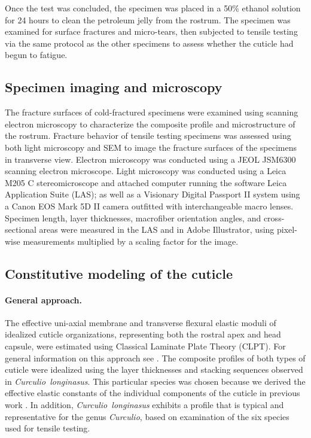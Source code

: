 \documentclass[twocolumn, linenumbers, superscriptaddress, nofootinbib]{revtex4-1}
\begin{document}
				Once the test was concluded, the specimen was placed in a 50\% ethanol solution for 24 hours to clean the petroleum jelly from the rostrum.
				The specimen was examined for surface fractures and micro-tears, then subjected to tensile testing via the same protocol as the other specimens to assess whether the cuticle had begun to fatigue.
		
		\subsection*{Specimen imaging and microscopy}
			The fracture surfaces of cold-fractured specimens were examined using scanning electron microscopy to characterize the composite profile and microstructure of the rostrum.
			Fracture behavior of tensile testing specimens was assessed using both light microscopy and SEM to image the fracture surfaces of the specimens in transverse view.
			Electron microscopy was conducted using a JEOL JSM6300 scanning electron microscope.
			Light microscopy was conducted using a Leica M205 C stereomicroscope and attached computer running the software Leica Application Suite (LAS); as well as a Visionary Digital Passport II system using a Canon EOS Mark 5D II camera outfitted with interchangeable macro lenses.
			Specimen length, layer thicknesses, macrofiber orientation angles, and cross-sectional areas were measured in the LAS and in Adobe Illustrator, using pixel-wise measurements multiplied by a scaling factor for the image.
		\subsection*{Constitutive modeling of the cuticle}
			\paragraph*{General approach.}
				The effective uni-axial membrane and transverse flexural elastic moduli of idealized cuticle organizations, representing both the rostral apex and head capsule, were estimated using Classical Laminate Plate Theory (CLPT).
				For general information on this approach see \cite{Jones2014, Reddy2004}.
				The composite profiles of both types of cuticle were idealized using the layer thicknesses and stacking sequences observed in \textit{Curculio~longinasus}.
				This particular species was chosen because we derived the effective elastic constants of the individual components of the cuticle in previous work \cite{Jansen2016, Singh2016}.
				In addition, \textit{Curculio~longinasus} exhibits a profile that is typical and representative for the genus \textit{Curculio}, based on examination of the six species used for tensile testing.
				
\end{document}
